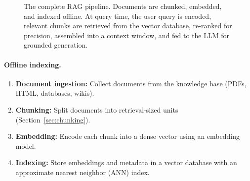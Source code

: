 \begin{figure}[H]
\caption{The complete RAG pipeline.  Documents are chunked, embedded, and
indexed offline.  At query time, the user query is encoded, relevant chunks
are retrieved from the vector database, re-ranked for precision, assembled
into a context window, and fed to the LLM for grounded generation.}
\label{fig:rag-pipeline}
\end{figure}

\paragraph{Offline indexing.}
\begin{enumerate}
    \item \textbf{Document ingestion:} Collect documents from the knowledge
          base (PDFs, HTML, databases, wikis).
    \item \textbf{Chunking:} Split documents into retrieval-sized units
          (Section~\ref{sec:chunking}).
    \item \textbf{Embedding:} Encode each chunk into a dense vector using an
          embedding model.
    \item \textbf{Indexing:} Store embeddings and metadata in a vector database
          with an approximate nearest neighbor (ANN) index.
\end{enumerate}

